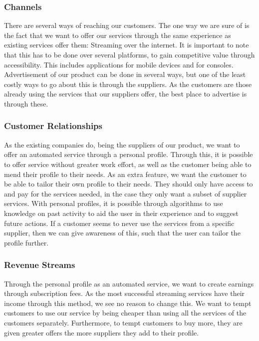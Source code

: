 \subsubsection*{Channels}
There are several ways of reaching our customers. The one way we are sure of is the fact that we want to offer our services through the same experience as existing services offer them: Streaming over the internet. It is important to note that this has to be done over several platforms, to gain competitive value through accessibility. This includes applications for mobile devices and for consoles. Advertisement of our product can be done in several ways, but one of the least costly ways to go about this is through the suppliers. As the customers are those already using the services that our suppliers offer, the best place to advertise is through these.

\subsubsection*{Customer Relationships}
As the existing companies do, being the suppliers of our product, we want to offer an automated service through a personal profile. Through this, it is possible to offer service without greater work effort, as well as the customer being able to mend their profile to their needs. As an extra feature, we want the customer to be able to tailor their own profile to their needs. They should only have access to and pay for the services needed, in the case they only want a subset of supplier services. With personal profiles, it is possible through algorithms to use knowledge on past activity to aid the user in their experience and to suggest future actions. If a customer seems to never use the services from a specific supplier, then we can give awareness of this, such that the user can tailor the profile further.

\subsubsection*{Revenue Streams}
Through the personal profile as an automated service, we want to create earnings through subscription fees. As the most successful streaming services have their income through this method, we see no reason to change this. We want to tempt customers to use our service by being cheaper than using all the services of the customers separately. Furthermore, to tempt customers to buy more, they are given greater offers the more suppliers they add to their profile.

